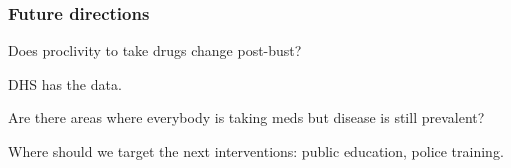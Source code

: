 \documentclass[11pt,final,hyperref={pdfpagelabels=false},xcolor=dvipsnames]{beamer}
\begin{document}
\begin{frame}\frametitle{Future directions}

    \begin{Witemize}
\setlength{\itemsep}{3pt}
\setlength{\parskip}{0pt}
\setlength{\parsep}{0pt}
\item  Does proclivity to take drugs change post-bust?
    \begin{Witemize}
    \item DHS has the data.
    \end{Witemize}
\pause
    \item Are there areas where everybody is taking meds but disease is still prevalent?
    \begin{Witemize}
    \item Where should we target the next interventions: public education, police training.
    \end{Witemize}
    \end{Witemize}

\end{frame}
\end{document}
